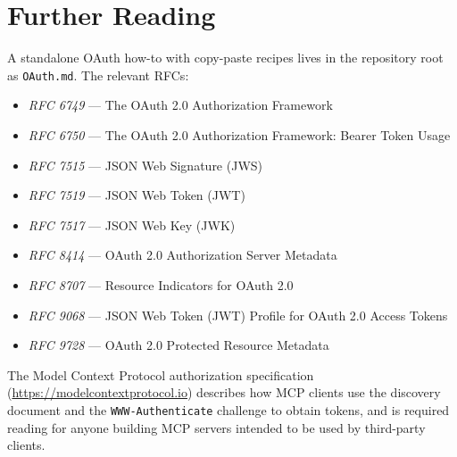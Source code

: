 \section{Further Reading}
\label{sec:oauth-references}

A standalone OAuth how-to with copy-paste recipes lives in the repository root as \texttt{OAuth.md}.  The relevant RFCs:

\begin{itemize}
  \item \emph{RFC 6749} --- The OAuth 2.0 Authorization Framework
  \item \emph{RFC 6750} --- The OAuth 2.0 Authorization Framework: Bearer Token Usage
  \item \emph{RFC 7515} --- JSON Web Signature (JWS)
  \item \emph{RFC 7519} --- JSON Web Token (JWT)
  \item \emph{RFC 7517} --- JSON Web Key (JWK)
  \item \emph{RFC 8414} --- OAuth 2.0 Authorization Server Metadata
  \item \emph{RFC 8707} --- Resource Indicators for OAuth 2.0
  \item \emph{RFC 9068} --- JSON Web Token (JWT) Profile for OAuth 2.0 Access Tokens
  \item \emph{RFC 9728} --- OAuth 2.0 Protected Resource Metadata
\end{itemize}

\noindent
The Model Context Protocol authorization specification (\url{https://modelcontextprotocol.io}) describes how MCP clients use the discovery document and the \texttt{WWW-Authenticate} challenge to obtain tokens, and is required reading for anyone building MCP servers intended to be used by third-party clients.
